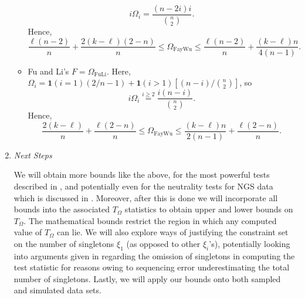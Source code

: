 \documentclass[lettersize, 10.5pt]{article}
\begin{document}
\begin{enumerate}
\begin{itemize}
\begin{equation*}
i\Omega_i = \frac{(n-2i)i}{{n\choose 2}}.
\end{equation*}
Hence, 
\begin{equation*}
\frac{\ell(n-2)}{n} + \frac{2(k-\ell)(2-n)}{n}\leqslant \Omega_\text{FayWu} \leqslant \frac{\ell(n-2)}{n} +\frac{(k-\ell)n}{4(n-1)}.
\end{equation*}
\item Fu and Li's $F=\Omega_\text{FuLi}$. Here, $\Omega_i=\mathbf{1}(i=1)(2/n - 1) + \mathbf{1}(i>1)\left[(n-i)\big/{n\choose 2}\right]$, so 
\begin{equation*}
i\Omega_i \overset{i\geqslant 2}{=} \frac{i(n-i)}{{n\choose 2}}.
\end{equation*}
Hence, 
\begin{equation*}
\frac{2(k-\ell)}{n}+\frac{\ell(2-n)}{n}\leqslant \Omega_\text{FayWu} \leqslant \frac{(k-\ell)n}{2(n-1)}+\frac{\ell(2-n)}{n}.
\end{equation*}
\end{itemize}
\item \textit{Next Steps}

We will obtain more bounds like the above, for the most powerful tests described in \cite{Ferretti2010}, and potentially even for the neutrality tests for NGS data which is discussed in \cite{Ferretti2013}. Moreover, after this is done we will incorporate all bounds into the associated $T_\Omega$ statistics to obtain upper and lower bounds on $T_\Omega$. The mathematical bounds restrict the region in which any computed value of $T_\Omega$ can lie. We will also explore ways of justifying the constraint set on the number of singletons $\xi_1$ (as opposed to other $\xi_i$'s), potentially looking into arguments given in \cite{Achaz2008} regarding the omission of singletons in computing the test statistic for reasons owing to sequencing error underestimating the total number of singletons. Lastly, we will apply our bounds onto both sampled and simulated data sets. 
\end{enumerate}
\end{document}
